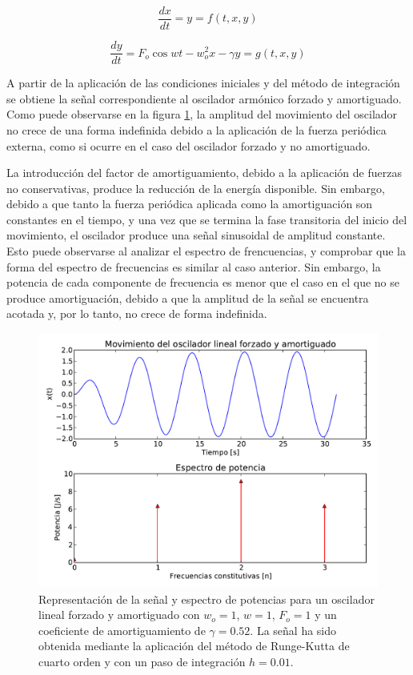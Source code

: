 \documentclass[11pt]{article}
\begin{document}
\begin{equation}
	\frac{dx}{dt} = y = f(t, x, y)
\end{equation}

\begin{equation}
	\frac{dy}{dt} = F_o\cos{wt} - w_o^2 x - \gamma{}y = g(t, x, y) 	
\end{equation}

A partir de la aplicación de las condiciones iniciales y del método de integración se obtiene la señal correspondiente al oscilador armónico forzado y amortiguado. Como puede observarse en la figura \ref{fig:caso_forzado_amortiguado}, la amplitud del movimiento del oscilador no crece de una forma indefinida debido a la aplicación de la fuerza periódica externa, como si ocurre en el caso del oscilador forzado y no amortiguado.

La introducción del factor de amortiguamiento, debido a la aplicación de fuerzas no conservativas, produce la reducción de la energía disponible. Sin embargo, debido a que tanto la fuerza periódica aplicada como la amortiguación son constantes en el tiempo, y una vez que se termina la fase transitoria del inicio del movimiento, el oscilador produce una señal sinusoidal de amplitud constante. Esto puede observarse al analizar el espectro de frencuencias, y comprobar que la forma del espectro de frecuencias es similar al caso anterior. Sin embargo, la potencia de cada componente de frecuencia es menor que el caso en el que no se produce amortiguación, debido a que la amplitud de la señal se encuentra acotada y, por lo tanto, no crece de forma indefinida.

\begin{figure}
\centering
\includegraphics[width=0.75\linewidth]{caso_forzado_amortiguado.pdf}
\caption{Representación de la señal y espectro de potencias para un oscilador lineal forzado y amortiguado con $w_o = 1$, $w = 1$, $F_o = 1$ y un coeficiente de amortiguamiento de $\gamma = 0.52$. La señal ha sido obtenida mediante la aplicación del método de Runge-Kutta de cuarto orden y con un paso de integración $h = 0.01$.}
\label{fig:caso_forzado_amortiguado}
\end{figure}
\end{document}
